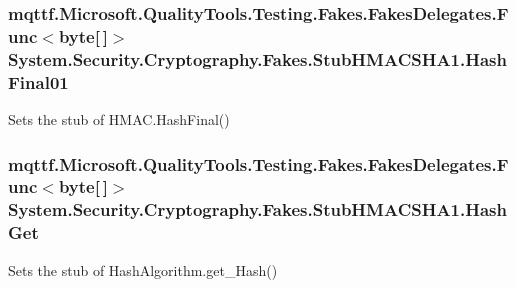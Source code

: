 \hypertarget{class_system_1_1_security_1_1_cryptography_1_1_fakes_1_1_stub_h_m_a_c_s_h_a1_a7a6b6abd1e9c911ca955f294ee65e42f}{
\subsubsection[{Hash\-Final01}]{\setlength{\rightskip}{0pt plus 5cm}mqttf.\-Microsoft.\-Quality\-Tools.\-Testing.\-Fakes.\-Fakes\-Delegates.\-Func$<$byte\mbox{[}$\,$\mbox{]}$>$ System.\-Security.\-Cryptography.\-Fakes.\-Stub\-H\-M\-A\-C\-S\-H\-A1.\-Hash\-Final01}}\label{class_system_1_1_security_1_1_cryptography_1_1_fakes_1_1_stub_h_m_a_c_s_h_a1_a7a6b6abd1e9c911ca955f294ee65e42f}


Sets the stub of H\-M\-A\-C.\-Hash\-Final()

\hypertarget{class_system_1_1_security_1_1_cryptography_1_1_fakes_1_1_stub_h_m_a_c_s_h_a1_a8cae1baebed9efe5ab741ae12a6dbdf1}{
\subsubsection[{Hash\-Get}]{\setlength{\rightskip}{0pt plus 5cm}mqttf.\-Microsoft.\-Quality\-Tools.\-Testing.\-Fakes.\-Fakes\-Delegates.\-Func$<$byte\mbox{[}$\,$\mbox{]}$>$ System.\-Security.\-Cryptography.\-Fakes.\-Stub\-H\-M\-A\-C\-S\-H\-A1.\-Hash\-Get}}\label{class_system_1_1_security_1_1_cryptography_1_1_fakes_1_1_stub_h_m_a_c_s_h_a1_a8cae1baebed9efe5ab741ae12a6dbdf1}


Sets the stub of Hash\-Algorithm.\-get\-\_\-\-Hash()

